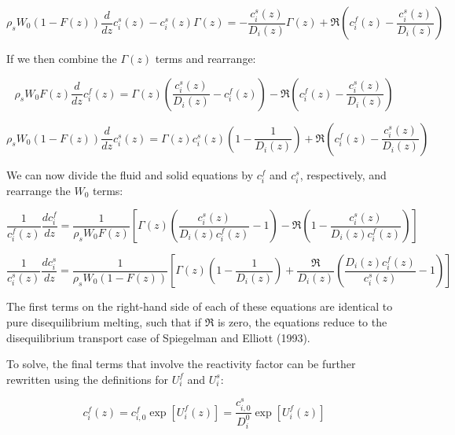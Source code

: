 \documentclass[11pt]{article}
\begin{document}
\begin{equation}
    \rho_s W_0 (1 - F(z))\frac{d}{dz}c_i^s(z) - c_i^s(z)\Gamma(z) = -\frac{c_i^s(z)}{D_i(z)}\Gamma(z) + \Re\left(c_i^f(z) - \frac{c_i^s(z)}{D_i(z)}\right)\label{eq:37}
\end{equation}

If we then combine the $\Gamma(z)$ terms and rearrange:

\begin{equation}
    \rho_s W_0 F(z)\frac{d}{dz} c_i^f(z) = \Gamma(z)\left(\frac{c_i^s(z)}{D_i(z)} - c_i^f(z)\right) - \Re\left(c_i^f(z) - \frac{c_i^s(z)}{D_i(z)}\right)\label{eq:38}
\end{equation}

\begin{equation}
    \rho_s W_0 (1 - F(z))\frac{d}{dz}c_i^s(z) = \Gamma(z) c_i^s(z)\left(1 - \frac{1}{D_i(z)}\right)+ \Re\left(c_i^f(z) - \frac{c_i^s(z)}{D_i(z)}\right)\label{eq:39}
\end{equation}

We can now divide the fluid and solid equations by $c_i^f$ and $c_i^s$, respectively, and rearrange the $W_0$ terms:

\begin{equation}
    \frac{1}{c_i^f(z)}\frac{dc_i^f}{dz} = \frac{1}{\rho_s W_0 F(z)}\left[\Gamma(z)\left(\frac{c_i^s(z)}{D_i(z) c_i^f(z)} - 1\right) - \Re\left(1 - \frac{c_i^s(z)}{D_i(z) c_i^f(z)}\right)\right]\label{eq:40}
\end{equation}

\begin{equation}
    \frac{1}{c_i^s(z)}\frac{dc_i^s}{dz} = \frac{1}{\rho_s W_0 (1 - F(z))}\left[\Gamma(z) \left(1 - \frac{1}{D_i(z)}\right)+ \frac{\Re}{D_i(z)}\left(\frac{D_i(z) c_i^f(z)}{c_i^s(z)} - 1\right) \right]\label{eq:41}
\end{equation}

The first terms on the right-hand side of each of these equations are identical to pure disequilibrium melting, such that if $\Re$ is zero, the equations reduce to the disequilibrium transport case of Spiegelman and Elliott (1993).

To solve, the final terms that involve the reactivity factor can be further rewritten using the definitions for $U_i^f$ and $U_i^s$:

\begin{equation}
    c_i^f(z) = c_{i,0}^f \exp[U_i^f(z)] = \frac{c_{i,0}^s}{D_i^0} \exp[U_i^f(z)]\label{eq:42}
\end{equation}
\end{document}
